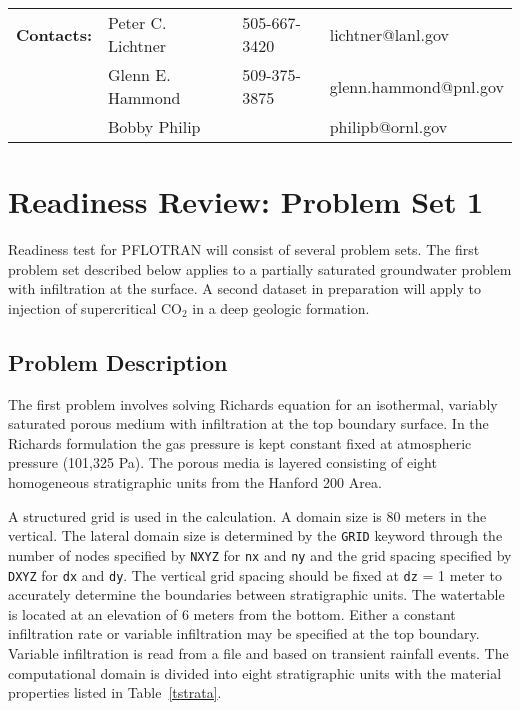 \documentclass[12pt]{article}
\begin{document}
\noindent
\begin{tabular}{llll}
{\bf Contacts:} &Peter C. Lichtner & 505-667-3420 & lichtner@lanl.gov\\
&Glenn E. Hammond & 509-375-3875 & glenn.hammond@pnl.gov\\
&Bobby Philip & & philipb@ornl.gov
\end{tabular}

\section{Readiness Review: Problem Set 1}

Readiness test for PFLOTRAN will consist of several problem sets. The first problem set described below applies to a partially saturated groundwater problem with infiltration at the surface. A second dataset in preparation will apply to injection of supercritical CO$_2$ in a deep geologic formation.

\subsection{Problem Description}

The first problem involves solving Richards equation for an isothermal, variably saturated porous medium with infiltration at the top boundary surface. In the Richards formulation the gas pressure is kept constant fixed at atmospheric pressure (101,325 Pa). The porous media is layered consisting of eight homogeneous stratigraphic units from the Hanford 200 Area.

A structured grid is used in the calculation.
A domain size is 80 meters in the vertical. The lateral domain size is determined by the {\tt GRID} keyword through the number of nodes specified by {\tt NXYZ} for {\tt nx} and {\tt ny} and the grid spacing specified by {\tt DXYZ} for {\tt dx} and {\tt dy}. The vertical grid spacing should be fixed at {\tt dz} = 1 meter to accurately determine the boundaries between stratigraphic units. The watertable is located at an elevation of 6 meters from the bottom. 
Either a constant infiltration rate or variable infiltration may be specified at the top boundary. Variable infiltration is read from a file and based on transient rainfall events.
The computational domain is divided into eight stratigraphic units with the material properties listed in Table~\ref{tstrata}.
\end{document}
